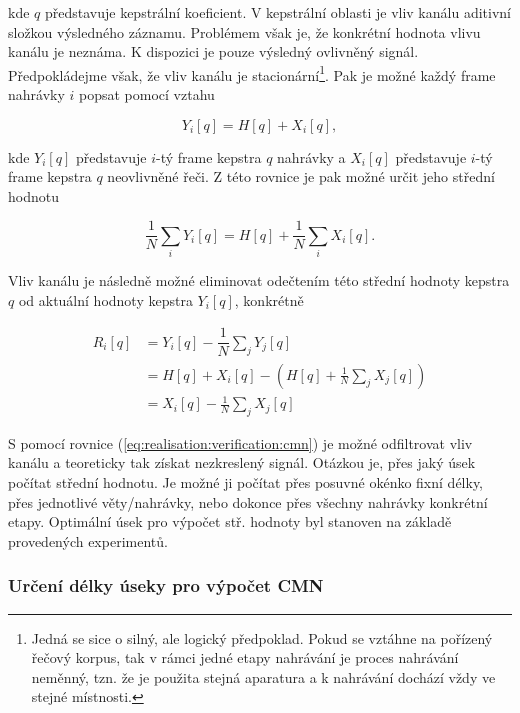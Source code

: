 \noindent kde $q$ představuje kepstrální koeficient.
V kepstrální oblasti je vliv kanálu aditivní složkou výsledného záznamu.
Problémem však je, že konkrétní hodnota vlivu kanálu je neznáma.
K dispozici je pouze výsledný ovlivněný signál.
Předpokládejme však, že vliv kanálu je stacionární\footnote{Jedná se sice o silný, ale logický předpoklad. Pokud se vztáhne na pořízený řečový korpus, tak v rámci jedné etapy nahrávání je proces nahrávání neměnný, tzn. že je použita stejná aparatura a k nahrávání dochází vždy ve stejné místnosti.}.
Pak je možné každý frame nahrávky $i$ popsat pomocí vztahu

\begin{equation}
  Y_i\left[q\right] = H\left[q\right] + X_i\left[q\right],
\end{equation}

\noindent kde $Y_i\left[q\right]$ představuje $i$-tý frame kepstra $q$ nahrávky a $X_i\left[q\right]$ představuje $i$-tý frame kepstra $q$ neovlivněné řeči.
Z této rovnice je pak možné určit jeho střední hodnotu

\begin{equation}
  \frac{1}{N} \sum_i Y_i\left[q\right] = H\left[q\right] + \frac{1}{N} \sum_i X_i\left[q\right].
\end{equation}

\noindent Vliv kanálu je následně možné eliminovat odečtením této střední hodnoty kepstra $q$ od aktuální hodnoty kepstra $Y_i\left[q\right]$, konkrétně

\begin{align}
  R_i\left[q\right] &= Y_i\left[q\right] - \dfrac{1}{N}\sum_{j} Y_j\left[q\right] \nonumber  \\
  &= H\left[q\right] + X_i\left[q\right] - \left( H\left[q\right] + \frac{1}{N} \sum_j X_j\left[q\right] \right) \nonumber  \\
  &= X_i\left[q\right] - \frac{1}{N} \sum_j X_j\left[q\right]
  \label{eq:realisation:verification:cmn}
\end{align}

\noindent S pomocí rovnice (\ref{eq:realisation:verification:cmn}) je možné odfiltrovat vliv kanálu a teoreticky tak získat nezkreslený signál.
Otázkou je, přes jaký úsek počítat střední hodnotu.
Je možné ji počítat přes posuvné okénko fixní délky, přes jednotlivé věty/nahrávky, nebo dokonce přes všechny nahrávky konkrétní etapy.
Optimální úsek pro výpočet stř. hodnoty byl stanoven na základě provedených experimentů.

\subsubsection{Určení délky úseky pro výpočet CMN}

